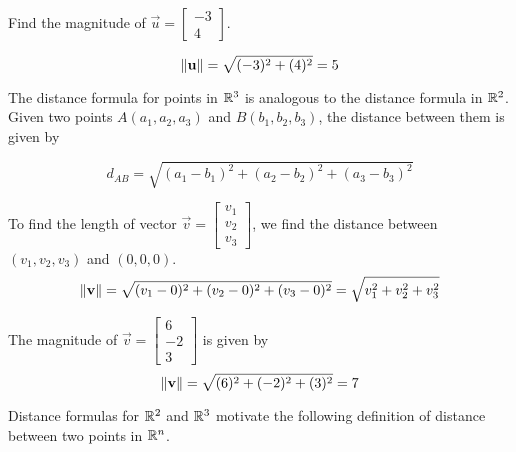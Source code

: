 \documentclass{ximera}
\begin{document}
\begin{example}\label{ex:findmaginr2} Find the magnitude of $\vec{u}=\begin{bmatrix}-3\\4\end{bmatrix}$.  
\begin{image}[1.8in]
\end{image}
\begin{explanation}

 $$
\left\lVert\mathbf{u}\right\rVert=\sqrt{(-3)^2+(4)^2}=5
$$
\end{explanation}
\end{example}


The distance formula for points in $\mathbb{R}^3$ is analogous to the distance formula in $\mathbb{R}^2$.  Given two points $A(a_1, a_2, a_3)$ and $B(b_1, b_2, b_3)$, the distance between them is given by 

\begin{equation*}
d_{AB}=\sqrt{(a_1-b_1)^2+(a_2-b_2)^2+(a_3-b_3)^2}
\end{equation*}

To find the length of vector $\vec{v}=\begin{bmatrix}v_1\\ v_2\\ v_3\end{bmatrix}$, we find the distance between $(v_1, v_2, v_3)$ and $(0, 0, 0)$.
\begin{equation}\label{eq:normr3}
\left\lVert\mathbf{v}\right\rVert=\sqrt{(v_1-0)^2+(v_2-0)^2+(v_3-0)^2}=\sqrt{v_1^2+v_2^2+v_3^2}
\end{equation}

\begin{example}\label{ex:findmaginr3}
The magnitude of $\vec{v}=\begin{bmatrix}6\\-2\\3\end{bmatrix}$ is given by
$$
\left\lVert\mathbf{v}\right\rVert=\sqrt{(6)^2+(-2)^2+(3)^2}=7
$$
\end{example}


Distance formulas for $\mathbb{R}^2$ and $\mathbb{R}^3$ motivate the following definition of distance between two points in $\mathbb{R}^n$.
\end{document}

